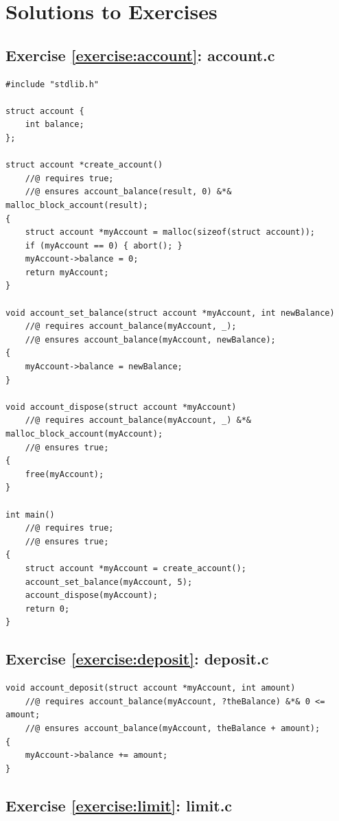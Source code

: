 \documentclass{article}
\begin{document}
\section{Solutions to Exercises}

\subsection{Exercise \ref{exercise:account}: account.c}

\begin{lstlisting}
#include "stdlib.h"

struct account {
    int balance;
};

struct account *create_account()
    //@ requires true;
    //@ ensures account_balance(result, 0) &*& malloc_block_account(result);
{
    struct account *myAccount = malloc(sizeof(struct account));
    if (myAccount == 0) { abort(); }
    myAccount->balance = 0;
    return myAccount;
}

void account_set_balance(struct account *myAccount, int newBalance)
    //@ requires account_balance(myAccount, _);
    //@ ensures account_balance(myAccount, newBalance);
{
    myAccount->balance = newBalance;
}

void account_dispose(struct account *myAccount)
    //@ requires account_balance(myAccount, _) &*& malloc_block_account(myAccount);
    //@ ensures true;
{
    free(myAccount);
}

int main()
    //@ requires true;
    //@ ensures true;
{
    struct account *myAccount = create_account();
    account_set_balance(myAccount, 5);
    account_dispose(myAccount);
    return 0;
}
\end{lstlisting}

\subsection{Exercise \ref{exercise:deposit}: deposit.c}

\begin{lstlisting}
void account_deposit(struct account *myAccount, int amount)
    //@ requires account_balance(myAccount, ?theBalance) &*& 0 <= amount;
    //@ ensures account_balance(myAccount, theBalance + amount);
{
    myAccount->balance += amount;
}
\end{lstlisting}

\subsection{Exercise \ref{exercise:limit}: limit.c}
\end{document}
